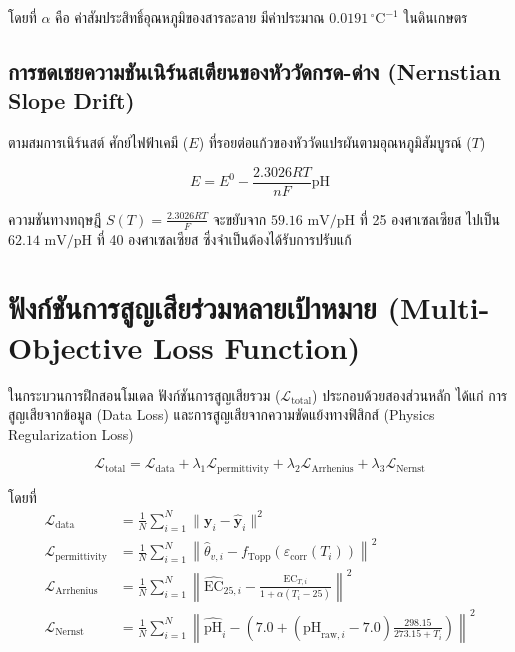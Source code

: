 โดยที่ $\alpha$ คือ ค่าสัมประสิทธิ์อุณหภูมิของสารละลาย มีค่าประมาณ $0.0191 \, ^\circ\text{C}^{-1}$ ในดินเกษตร

\subsection{การชดเชยความชันเนิร์นสเตียนของหัววัดกรด-ด่าง (Nernstian Slope Drift)}
ตามสมการเนิร์นสต์ ศักย์ไฟฟ้าเคมี ($E$) ที่รอยต่อแก้วของหัววัดแปรผันตามอุณหภูมิสัมบูรณ์ ($T$)

\begin{equation}
E = E^0 - \frac{2.3026 R T}{nF} \text{pH}
\end{equation}

ความชันทางทฤษฎี $S(T) = \frac{2.3026 R T}{F}$ จะขยับจาก $59.16 \text{ mV/pH}$ ที่ 25 องศาเซลเซียส ไปเป็น $62.14 \text{ mV/pH}$ ที่ 40 องศาเซลเซียส ซึ่งจำเป็นต้องได้รับการปรับแก้

\section{ฟังก์ชันการสูญเสียร่วมหลายเป้าหมาย (Multi-Objective Loss Function)}

ในกระบวนการฝึกสอนโมเดล ฟังก์ชันการสูญเสียรวม ($\mathcal{L}_{\text{total}}$) ประกอบด้วยสองส่วนหลัก ได้แก่ การสูญเสียจากข้อมูล (Data Loss) และการสูญเสียจากความขัดแย้งทางฟิสิกส์ (Physics Regularization Loss)

\begin{equation}
\mathcal{L}_{\text{total}} = \mathcal{L}_{\text{data}} + \lambda_1 \mathcal{L}_{\text{permittivity}} + \lambda_2 \mathcal{L}_{\text{Arrhenius}} + \lambda_3 \mathcal{L}_{\text{Nernst}}
\end{equation}

โดยที่
\begin{align}
\mathcal{L}_{\text{data}} &= \frac{1}{N}\sum_{i=1}^N \|\mathbf{y}_i - \hat{\mathbf{y}}_i\|^2 \\
\mathcal{L}_{\text{permittivity}} &= \frac{1}{N}\sum_{i=1}^N \left\|\hat{\theta}_{v,i} - f_{\text{Topp}}(\varepsilon_{\text{corr}}(T_i))\right\|^2 \\
\mathcal{L}_{\text{Arrhenius}} &= \frac{1}{N}\sum_{i=1}^N \left\|\hat{\text{EC}}_{25,i} - \frac{\text{EC}_{T,i}}{1 + \alpha(T_i - 25)}\right\|^2 \\
\mathcal{L}_{\text{Nernst}} &= \frac{1}{N}\sum_{i=1}^N \left\|\hat{\text{pH}}_i - \left(7.0 + (\text{pH}_{\text{raw},i} - 7.0)\frac{298.15}{273.15 + T_i}\right)\right\|^2
\end{align}

